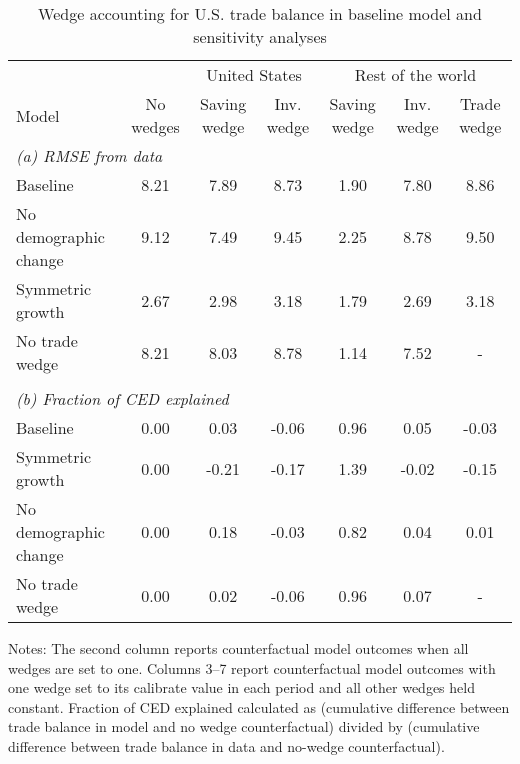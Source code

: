 \begin{table}[p]
\footnotesize
\begin{center}
\caption{Wedge accounting for U.S. trade balance in baseline model and sensitivity analyses}
\label{tab:tb-results-2}
\begin{threeparttable}\begin{tabular}{lcccccc}
\toprule
& & \multicolumn{2}{c}{United States} & \multicolumn{3}{c}{Rest of the world}\\
\cmidrule(rl){3-4}\cmidrule(rl){5-7}
Model & No wedges & Saving wedge & Inv. wedge & Saving wedge & Inv. wedge & Trade wedge\\
\midrule
\multicolumn{7}{l}{\textit{(a) RMSE from data}}\\
Baseline& 8.21 & 7.89 & 8.73 & 1.90 & 7.80 & 8.86\\
No demographic change& 9.12 & 7.49 & 9.45 & 2.25 & 8.78 & 9.50\\
Symmetric growth& 2.67 & 2.98 & 3.18 & 1.79 & 2.69 & 3.18\\
No trade wedge& 8.21 & 8.03 & 8.78 & 1.14 & 7.52 & -\\
\\
\multicolumn{7}{l}{\textit{(b) Fraction of CED explained}}\\
Baseline& 0.00 & 0.03 & -0.06 & 0.96 & 0.05 & -0.03\\
Symmetric growth& 0.00 & -0.21 & -0.17 & 1.39 & -0.02 & -0.15\\
No demographic change& 0.00 & 0.18 & -0.03 & 0.82 & 0.04 & 0.01\\
No trade wedge& 0.00 & 0.02 & -0.06 & 0.96 & 0.07 & -\\
\bottomrule
\end{tabular}
\begin{tablenotes}
\item Notes: The second column reports counterfactual model outcomes when all wedges are set to one. Columns 3--7 report counterfactual model outcomes with one wedge set to its calibrate value in each period and all other wedges held constant. Fraction of CED explained calculated as (cumulative difference between trade balance in model and no wedge counterfactual) divided by (cumulative difference between trade balance in data and no-wedge counterfactual).\end{tablenotes}
\end{threeparttable}
\end{center}
\normalsize
\end{table}
